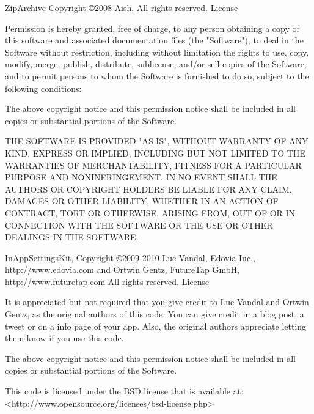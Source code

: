\documentclass[oneside, openany, 12pt]{tufte-book}
\newcommand{\ipad}[1]{}
\newcommand{\ipad}[1]{#1}
\newcommand{\licensetext}{\scriptsize \setlength{\parskip}{0mm} \singlespacing}
\begin{document}
ZipArchive Copyright \copyright 2008 Aish. All rights reserved. \href{http://www.opensource.org/licenses/mit-license.php}{License}

{\licensetext 
Permission is hereby granted, free of charge, to any person obtaining a copy of this software and associated documentation files (the "Software"), to deal in the Software without restriction, including without limitation the rights to use, copy, modify, merge, publish, distribute, sublicense, and/or sell copies of the Software, and to permit persons to whom the Software is furnished to do so, subject to the following conditions:

The above copyright notice and this permission notice shall be included in all copies or substantial portions of the Software.

THE SOFTWARE IS PROVIDED "AS IS", WITHOUT WARRANTY OF ANY KIND, EXPRESS OR IMPLIED, INCLUDING BUT NOT LIMITED TO THE WARRANTIES OF MERCHANTABILITY, FITNESS FOR A PARTICULAR PURPOSE AND NONINFRINGEMENT. IN NO EVENT SHALL THE AUTHORS OR COPYRIGHT HOLDERS BE LIABLE FOR ANY CLAIM, DAMAGES OR OTHER LIABILITY, WHETHER IN AN ACTION OF CONTRACT, TORT OR OTHERWISE, ARISING FROM, OUT OF OR IN CONNECTION WITH THE SOFTWARE OR THE USE OR OTHER DEALINGS IN THE SOFTWARE.}


InAppSettingsKit, Copyright \copyright 2009-2010 Luc Vandal, Edovia Inc., http://www.edovia.com and Ortwin Gentz, FutureTap GmbH, http://www.futuretap.com All rights reserved. \href{http://www.opensource.org/licenses/bsd-license.php}{License}

{\licensetext It is appreciated but not required that you give credit to Luc Vandal and Ortwin Gentz, as the original authors of this code. You can give credit in a blog post, a tweet or on a info page of your app. Also, the original authors appreciate letting them know if you use this code.

The above copyright notice and this permission notice shall be included in all copies or substantial portions of the Software.

This code is licensed under the BSD license that is available at: <http://www.opensource.org/licenses/bsd-license.php>}

\ipad{\end{fullwidth}}
\end{document}
